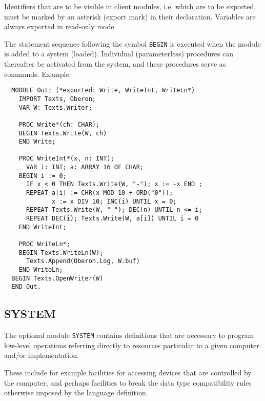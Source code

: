 Identifiers that are to be visible in client modules, i.e. which are to be exported, must
be marked by an asterisk (export mark) in their declaration. Variables are always exported
in read-only mode.

The statement sequence following the symbol \verb|BEGIN| is executed when the module is added
to a system (loaded). Individual (parameterless) procedures can thereafter be activated from
the system, and these procedures serve as commands.  Example:
\begin{verbatim}
  MODULE Out; (*exported: Write, WriteInt, WriteLn*)
    IMPORT Texts, Oberon;
    VAR W: Texts.Writer;
 
    PROC Write*(ch: CHAR);
    BEGIN Texts.Write(W, ch)
    END Write;
 
    PROC WriteInt*(x, n: INT);
      VAR i: INT; a: ARRAY 16 OF CHAR;
    BEGIN i := 0;
      IF x < 0 THEN Texts.Write(W, "-"); x := -x END ;
      REPEAT a[i] := CHR(x MOD 10 + ORD("0"));
             x := x DIV 10; INC(i) UNTIL x = 0;
      REPEAT Texts.Write(W, " "); DEC(n) UNTIL n <= i;
      REPEAT DEC(i); Texts.Write(W, a[i]) UNTIL i = 0
    END WriteInt;
 
    PROC WriteLn*;
    BEGIN Texts.WriteLn(W);
      Texts.Append(Oberon.Log, W.buf)
    END WriteLn;
  BEGIN Texts.OpenWriter(W)
  END Out.
\end{verbatim}

\subsection{SYSTEM}
The optional module \verb|SYSTEM| contains definitions that are necessary to program low-level
operations referring directly to resources particular to a given computer and/or implementation.

These include for example facilities for accessing devices that are controlled by the
computer, and perhaps facilities to break the data type compatibility rules otherwise
imposed by the language definition.

